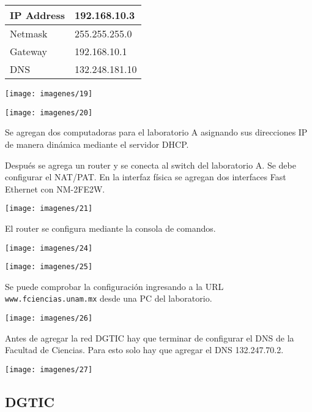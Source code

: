 \documentclass{article}
\begin{document}
\begin{center}
\begin{tabular}{|l|l|}
\hline
IP Address & 192.168.10.3 \\ \hline
Netmask & 255.255.255.0 \\ \hline
Gateway & 192.168.10.1 \\ \hline
DNS & 132.248.181.10 \\ \hline
\end{tabular}
\end{center}

\begin{center}
\texttt{[image: imagenes/19]}

\texttt{[image: imagenes/20]}
\end{center}

Se agregan dos computadoras para el laboratorio A asignando sus direcciones IP de manera dinámica mediante el servidor DHCP.

Después se agrega un router y se conecta al switch del laboratorio A. Se debe configurar el NAT/PAT. En la interfaz física se agregan dos interfaces Fast Ethernet con NM-2FE2W.

\begin{center}
\texttt{[image: imagenes/21]}
\end{center}

El router se configura mediante la consola de comandos.

\begin{center}
\texttt{[image: imagenes/24]}

\texttt{[image: imagenes/25]}
\end{center}

Se puede comprobar la configuración ingresando a la URL \texttt{www.fciencias.unam.mx} desde una PC del laboratorio.

\begin{center}
\texttt{[image: imagenes/26]}
\end{center}

Antes de agregar la red DGTIC hay que terminar de configurar el DNS de la Facultad de Ciencias. Para esto solo hay que agregar el DNS 132.247.70.2.

\begin{center}
\texttt{[image: imagenes/27]}
\end{center}

\subsection{DGTIC}
\end{document}
